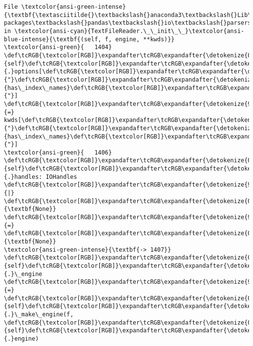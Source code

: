 \documentclass[11pt]{article}
\begin{document}
\begin{Verbatim}[commandchars=\\\{\}, frame=single, framerule=2mm, rulecolor=\color{outerrorbackground}]
File \textcolor{ansi-green-intense}{\textbf{\textasciitilde{}\textbackslash{}anaconda3\textbackslash{}Lib\textbackslash{}site-packages\textbackslash{}pandas\textbackslash{}io\textbackslash{}parsers\textbackslash{}readers.py:1407}}, in \textcolor{ansi-cyan}{TextFileReader.\_\_init\_\_}\textcolor{ansi-blue-intense}{\textbf{(self, f, engine, **kwds)}}
\textcolor{ansi-green}{   1404}     \def\tcRGB{\textcolor[RGB]}\expandafter\tcRGB\expandafter{\detokenize{0,135,0}}{self}\def\tcRGB{\textcolor[RGB]}\expandafter\tcRGB\expandafter{\detokenize{98,98,98}}{.}options[\def\tcRGB{\textcolor[RGB]}\expandafter\tcRGB\expandafter{\detokenize{175,0,0}}{"}\def\tcRGB{\textcolor[RGB]}\expandafter\tcRGB\expandafter{\detokenize{175,0,0}}{has\_index\_names}\def\tcRGB{\textcolor[RGB]}\expandafter\tcRGB\expandafter{\detokenize{175,0,0}}{"}] \def\tcRGB{\textcolor[RGB]}\expandafter\tcRGB\expandafter{\detokenize{98,98,98}}{=} kwds[\def\tcRGB{\textcolor[RGB]}\expandafter\tcRGB\expandafter{\detokenize{175,0,0}}{"}\def\tcRGB{\textcolor[RGB]}\expandafter\tcRGB\expandafter{\detokenize{175,0,0}}{has\_index\_names}\def\tcRGB{\textcolor[RGB]}\expandafter\tcRGB\expandafter{\detokenize{175,0,0}}{"}]
\textcolor{ansi-green}{   1406} \def\tcRGB{\textcolor[RGB]}\expandafter\tcRGB\expandafter{\detokenize{0,135,0}}{self}\def\tcRGB{\textcolor[RGB]}\expandafter\tcRGB\expandafter{\detokenize{98,98,98}}{.}handles: IOHandles \def\tcRGB{\textcolor[RGB]}\expandafter\tcRGB\expandafter{\detokenize{98,98,98}}{|} \def\tcRGB{\textcolor[RGB]}\expandafter\tcRGB\expandafter{\detokenize{0,135,0}}{\textbf{None}} \def\tcRGB{\textcolor[RGB]}\expandafter\tcRGB\expandafter{\detokenize{98,98,98}}{=} \def\tcRGB{\textcolor[RGB]}\expandafter\tcRGB\expandafter{\detokenize{0,135,0}}{\textbf{None}}
\textcolor{ansi-green-intense}{\textbf{-> 1407}} \def\tcRGB{\textcolor[RGB]}\expandafter\tcRGB\expandafter{\detokenize{0,135,0}}{self}\def\tcRGB{\textcolor[RGB]}\expandafter\tcRGB\expandafter{\detokenize{98,98,98}}{.}\_engine \def\tcRGB{\textcolor[RGB]}\expandafter\tcRGB\expandafter{\detokenize{98,98,98}}{=} \def\tcRGB{\textcolor[RGB]}\expandafter\tcRGB\expandafter{\detokenize{0,135,0}}{self}\def\tcRGB{\textcolor[RGB]}\expandafter\tcRGB\expandafter{\detokenize{98,98,98}}{.}\_make\_engine(f, \def\tcRGB{\textcolor[RGB]}\expandafter\tcRGB\expandafter{\detokenize{0,135,0}}{self}\def\tcRGB{\textcolor[RGB]}\expandafter\tcRGB\expandafter{\detokenize{98,98,98}}{.}engine)


\end{Verbatim}
\end{document}
